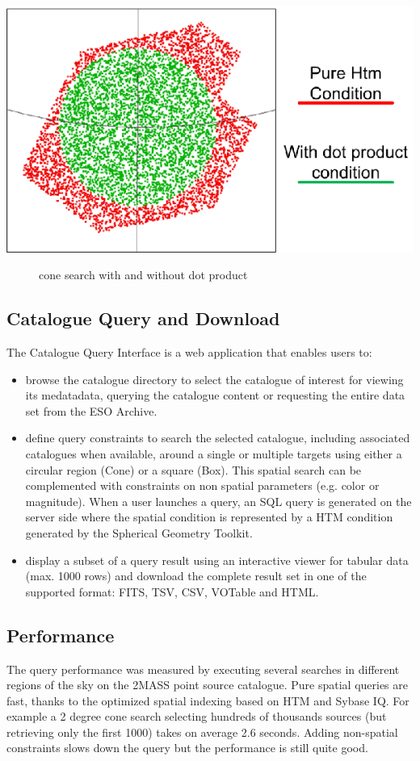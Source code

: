 \begin {center}
\includegraphics  [scale=0.8]{part8/Moins_P64/P64_2}
\begin{figure} [h]
\caption{cone search with and without dot product}
\end{figure}
\end {center}

\subsection{Catalogue Query and Download}
The Catalogue Query Interface is a web application that enables users to:
\begin{itemize}
\item browse the catalogue directory to select the catalogue of interest for viewing its medatadata, querying the catalogue content or
requesting the entire data set from the ESO Archive.
\item define query constraints to search the selected catalogue, including associated catalogues when available, around a single or multiple targets using either a circular region (Cone) or a square (Box). This spatial search can be complemented with constraints on non spatial parameters (e.g. color or magnitude). When a user launches a query, an SQL query is generated on the server side where the spatial condition is represented by a HTM condition generated by the Spherical Geometry Toolkit.
\item display a subset of a query result using an interactive viewer for tabular data (max. 1000 rows) and download the complete result set in one of the supported format: 
FITS, TSV, CSV, VOTable and HTML.
\end{itemize}

\subsection{Performance}
The query performance was measured by executing several searches in different regions of the sky on the 2MASS point source catalogue. Pure spatial queries are fast, thanks to the optimized spatial indexing based on HTM and Sybase IQ. For example a 2 degree cone search selecting hundreds of thousands sources (but retrieving only the first 1000) takes on average 2.6 seconds. Adding non-spatial constraints slows down the query but the performance is still quite good.

